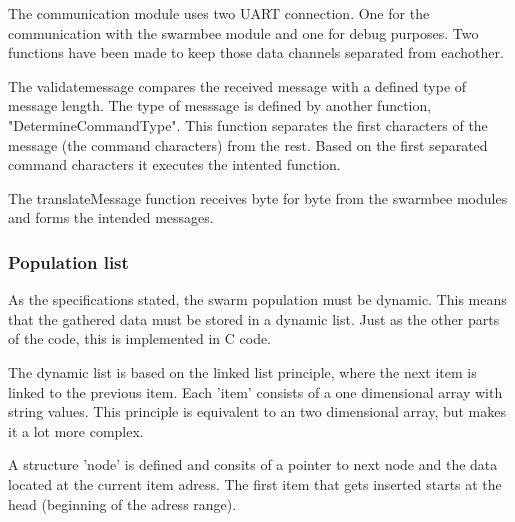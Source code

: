 \documentclass[10pt,a4paper]{article}
\begin{document}


The communication module uses two UART connection. One for the communication with the swarmbee module and one for debug purposes. Two functions have been made to keep those data channels separated from eachother.

The validatemessage compares the received message with a defined type of message length. The type of messsage is defined by another function, "DetermineCommandType". This function separates the first characters of the message (the command characters) from the rest. Based on the first separated command characters it executes the intented function.




The translateMessage function receives byte for byte from the swarmbee modules and forms the intended messages.




\subsubsection{Population list}
As the specifications stated, the swarm population must be dynamic. This means that the gathered data must be stored in a dynamic list. Just as the other parts of the code, this is implemented in C code.

The dynamic list is based on the linked list principle, where the next item is linked to the previous item. Each 'item' consists of a one dimensional array with string values. This principle is equivalent to an two dimensional array, but makes it a lot more complex. 

A structure 'node' is defined and consits of a pointer to next node and the data located at the current item adress. The first item that gets inserted starts at the head (beginning of the adress range).


\end{document}
